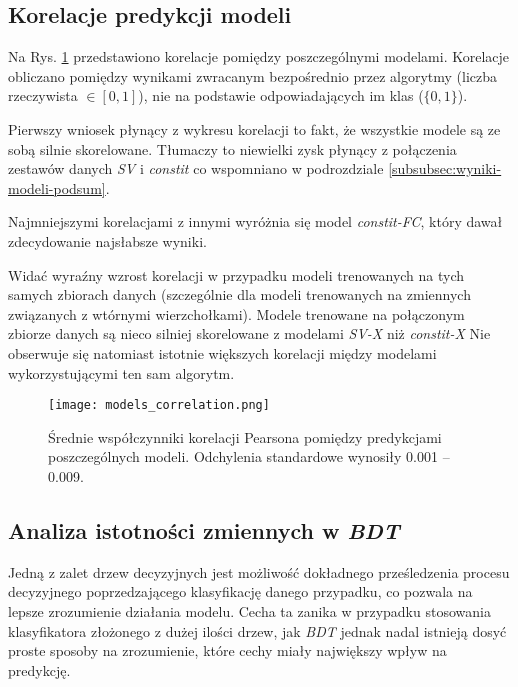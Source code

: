 \subsection{Korelacje predykcji modeli}

Na Rys. \ref{fig:models_corr} przedstawiono korelacje pomiędzy poszczególnymi modelami. Korelacje obliczano pomiędzy wynikami zwracanym bezpośrednio przez algorytmy (liczba rzeczywista $\in [0,1]$), nie na podstawie odpowiadających im klas ($\{0,1\}$).

Pierwszy wniosek płynący z wykresu korelacji to fakt, że wszystkie modele są ze sobą silnie skorelowane. Tłumaczy to niewielki zysk płynący z połączenia zestawów danych \textit{SV} i \textit{constit} co wspomniano w podrozdziale \ref{subsubsec:wyniki-modeli-podsum}.

Najmniejszymi korelacjami z innymi wyróżnia się model \textit{constit-FC}, który dawał zdecydowanie najsłabsze wyniki.

Widać wyraźny wzrost korelacji w przypadku modeli trenowanych na tych samych zbiorach danych (szczególnie dla modeli trenowanych na zmiennych związanych z wtórnymi wierzchołkami). 
Modele trenowane na połączonym zbiorze danych są nieco silniej skorelowane z modelami \textit{SV-X} niż \textit{constit-X}
Nie obserwuje się natomiast istotnie większych korelacji między modelami wykorzystującymi ten sam algorytm.

\begin{figure}[ht]
	\centering
	\texttt{[image: models\_correlation.png]}
	\caption{Średnie współczynniki korelacji Pearsona pomiędzy predykcjami poszczególnych modeli. Odchylenia standardowe wynosiły 0.001 -- 0.009.}
	\label{fig:models_corr}
\end{figure}


\newpage
\FloatBarrier
\subsection{Analiza istotności zmiennych w \textit{BDT}}
\label{subsec:feat-imp}

Jedną z zalet drzew decyzyjnych jest możliwość dokładnego prześledzenia procesu decyzyjnego poprzedzającego klasyfikację danego przypadku, co pozwala na lepsze zrozumienie działania modelu. Cecha ta zanika w przypadku stosowania klasyfikatora złożonego z dużej ilości drzew, jak \textit{BDT} jednak nadal istnieją dosyć proste sposoby na zrozumienie, które cechy miały największy wpływ na predykcję.

